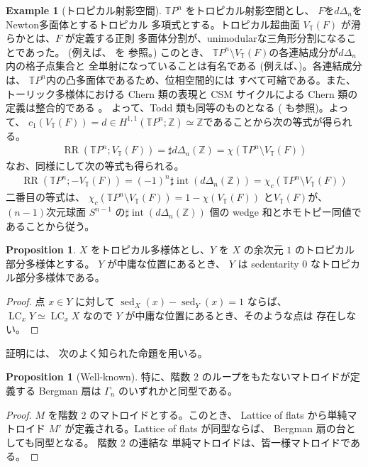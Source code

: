 \documentclass[a4paper,dvipdfmx,reqno,12pt]{amsart}
\theoremstyle{definition}
\newtheorem{example}[theorem]{Example}
\newtheorem{proposition}[theorem]{Proposition}
\newcommand{\opn}[1]{\operatorname{#1}}
\numberwithin{equation}{section}
\begin{document}
\begin{example}[{トロピカル射影空間}]
\label{example-TPn}
$\mathbb{T}P^{n}$ をトロピカル射影空間とし、
$F$を$d\Delta_{n}$をNewton多面体とするトロピカル
多項式とする。トロピカル超曲面 
$V_{\mathbb{T}}(F)$ が滑らかとは、$F$ が定義する正則
多面体分割が、unimodularな三角形分割になることであった。
(例えば、\cite[]{MR3287221} を
参照。)
このとき、
$\mathbb{T}P^{n}\setminus
V_{\mathbb{T}}(F)$の各連結成分が$d\Delta_n$内の格子点集合と
全単射になっていることは有名である
(例えば、\cite[Proposition 3.1.6]{MR3287221})。各連結成分は、
$\mathbb{T}P^{n}$内の凸多面体であるため、位相空間的には
すべて可縮である。また、
トーリック多様体における Chern 類の表現と
CSM サイクルによる Chern 類の定義は整合的である
\cite[Proposition 13.1.2]{MR2810322}。
よって、Todd 類も同等のものとなる
(\cite[Theorem 13.1.6]{MR2810322} も参照)。よって、
$c_1(V_{\mathbb{T}}(F))=d\in H^{1,1}(\mathbb{T}P^{n};
\mathbb{Z})
\simeq \mathbb{Z}$であることから次の等式が得られる。
\begin{align}
\opn{RR}(\mathbb{T}P^{n};V_{\mathbb{T}}(F))=
\sharp d\Delta_n(\mathbb{Z})=
\chi(\mathbb{T}P^{n}\setminus
V_{\mathbb{T}}(F))
\end{align}
なお、同様にして次の等式も得られる。
\begin{align}
\opn{RR}(\mathbb{T}P^{n};-V_{\mathbb{T}}(F))=
(-1)^{n}\sharp \opn{int}(d\Delta_n(\mathbb{Z}))=
\chi_{c}(\mathbb{T}P^{n}\setminus
V_{\mathbb{T}}(F))   
\end{align}
二番目の等式は、
$\chi_{c}(\mathbb{T}P^{n}\setminus
V_{\mathbb{T}}(F))=1-\chi (V_{\mathbb{T}}(F))$
と$V_{\mathbb{T}}(F)$が、$(n-1)$次元球面
$S^{n-1}$ 
の$\sharp \opn{int}(d\Delta_n(\mathbb{Z}))$
個の wedge 和とホモトピー同値であることから従う。
\end{example}

\begin{proposition}
$X$ をトロピカル多様体とし、$Y$ を
$X$ の余次元 $1$
のトロピカル部分多様体とする。
$Y$ が中庸な位置にあるとき、
$Y$ は sedentarity 0 なトロピカル部分多様体である。
\end{proposition}
\begin{proof}
点 $x\in Y$ に対して
$\opn{sed}_X(x)-\opn{sed}_Y(x)=1$ ならば、
$\opn{LC}_xY\simeq \opn{LC}_x X$ なので
$Y$ が中庸な位置にあるとき、そのような点は
存在しない。
\end{proof}

証明には、
次のよく知られた命題を用いる。
\begin{proposition}[{Well-known}]


特に、階数 $2$ のループをもたないマトロイドが定義する
Bergman 扇は $\Gamma_n$ のいずれかと同型である。
\end{proposition}
\begin{proof}
$M$ を階数 $2$ のマトロイドとする。このとき、
Lattice of flats から単純マトロイド
$M'$ が定義される。Lattice of flats が同型ならば、
Bergman 扇の台としても同型となる。
階数 $2$ の連結な
単純マトロイドは、皆一様マトロイドである。
\end{proof}
\end{document}
